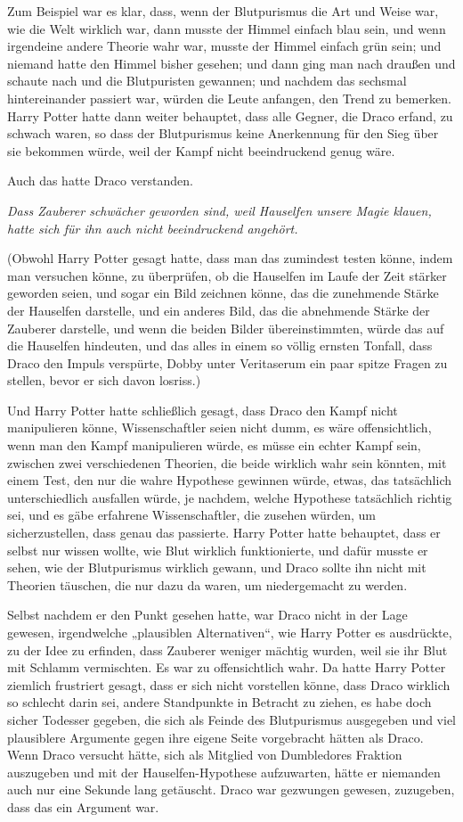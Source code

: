 {Zum Beispiel war es klar, dass, wenn der Blutpurismus die Art und Weise war, wie die Welt wirklich war, dann musste der Himmel einfach blau sein, und wenn irgendeine andere Theorie wahr war, musste der Himmel einfach grün sein; und niemand hatte den Himmel bisher gesehen; und dann ging man nach draußen und schaute nach und die Blutpuristen gewannen; und nachdem das sechsmal hintereinander passiert war, würden die Leute anfangen, den Trend zu bemerken. Harry Potter hatte dann weiter behauptet, dass alle Gegner, die Draco erfand, zu schwach waren, so dass der Blutpurismus keine Anerkennung für den Sieg über sie bekommen würde, weil der Kampf nicht beeindruckend genug wäre.

Auch das hatte Draco verstanden.

\emph{Dass Zauberer schwächer geworden sind, weil Hauselfen unsere Magie klauen, hatte sich für ihn auch nicht beeindruckend angehört.}

(Obwohl Harry Potter gesagt hatte, dass man das zumindest testen könne, indem man versuchen könne, zu überprüfen, ob die Hauselfen im Laufe der Zeit stärker geworden seien, und sogar ein Bild zeichnen könne, das die zunehmende Stärke der Hauselfen darstelle, und ein anderes Bild, das die abnehmende Stärke der Zauberer darstelle, und wenn die beiden Bilder übereinstimmten, würde das auf die Hauselfen hindeuten, und das alles in einem so völlig ernsten Tonfall, dass Draco den Impuls verspürte, Dobby unter Veritaserum ein paar spitze Fragen zu stellen, bevor er sich davon losriss.)

Und Harry Potter hatte schließlich gesagt, dass Draco den Kampf nicht manipulieren könne, Wissenschaftler seien nicht dumm, es wäre offensichtlich, wenn man den Kampf manipulieren würde, es müsse ein echter Kampf sein, zwischen zwei verschiedenen Theorien, die beide wirklich wahr sein könnten, mit einem Test, den nur die wahre Hypothese gewinnen würde, etwas, das tatsächlich unterschiedlich ausfallen würde, je nachdem, welche Hypothese tatsächlich richtig sei, und es gäbe erfahrene Wissenschaftler, die zusehen würden, um sicherzustellen, dass genau das passierte. Harry Potter hatte behauptet, dass er selbst nur wissen wollte, wie Blut wirklich funktionierte, und dafür musste er sehen, wie der Blutpurismus wirklich gewann, und Draco sollte ihn nicht mit Theorien täuschen, die nur dazu da waren, um niedergemacht zu werden.

Selbst nachdem er den Punkt gesehen hatte, war Draco nicht in der Lage gewesen, irgendwelche „plausiblen Alternativen“, wie Harry Potter es ausdrückte, zu der Idee zu erfinden, dass Zauberer weniger mächtig wurden, weil sie ihr Blut mit Schlamm vermischten. Es war zu offensichtlich wahr. Da hatte Harry Potter ziemlich frustriert gesagt, dass er sich nicht vorstellen könne, dass Draco wirklich so schlecht darin sei, andere Standpunkte in Betracht zu ziehen, es habe doch sicher Todesser gegeben, die sich als Feinde des Blutpurismus ausgegeben und viel plausiblere Argumente gegen ihre eigene Seite vorgebracht hätten als Draco. Wenn Draco versucht hätte, sich als Mitglied von Dumbledores Fraktion auszugeben und mit der Hauselfen-Hypothese aufzuwarten, hätte er niemanden auch nur eine Sekunde lang getäuscht. Draco war gezwungen gewesen, zuzugeben, dass das ein Argument war.

}
